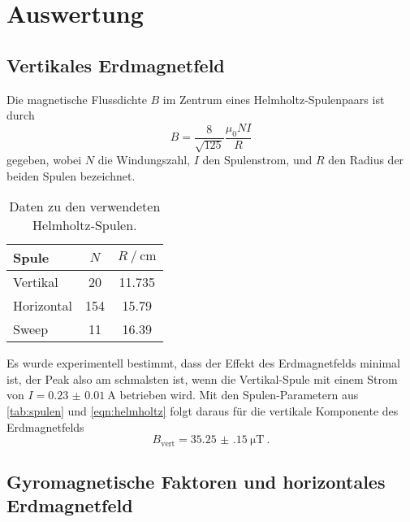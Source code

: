 \section{Auswertung}
\label{sec:auswertung}

\subsection{Vertikales Erdmagnetfeld}

Die magnetische Flussdichte $B$ im Zentrum eines Helmholtz-Spulenpaars ist durch
\begin{equation}
    B = \frac{8}{\sqrt{125}} \frac{\mu_0 NI}{R}
    \label{eqn:helmholtz}
\end{equation}
gegeben,
wobei $N$ die Windungszahl, $I$ den Spulenstrom, und $R$ den Radius der beiden Spulen bezeichnet. %

\begin{table}
    \centering
    \caption{Daten zu den verwendeten Helmholtz-Spulen. \cite{versuchsanleitung}}
    \label{tab:spulen}
    \begin{tabular}{l S S}
        \toprule
        Spule &
        {$N$} &
        {$R \mathbin{/} \si{\centi\meter}$} \\
        \midrule
        Vertikal   &  20 & 11.735 \\
        Horizontal & 154 & 15.79  \\
        Sweep      &  11 & 16.39  \\
        \bottomrule
    \end{tabular}
\end{table}

Es wurde experimentell bestimmt,
dass der Effekt des Erdmagnetfelds minimal ist,
der Peak also am schmalsten ist,
wenn die Vertikal-Spule mit einem Strom von ${ I = \SI{0.23(1)}{\ampere} }$ betrieben wird.
Mit den Spulen-Parametern aus \autoref{tab:spulen} und \autoref{eqn:helmholtz}
folgt daraus für die vertikale Komponente des Erdmagnetfelds
\[ B_\text{vert} = \SI{35.25(15)}{\micro\tesla} \ . \]


\subsection{Gyromagnetische Faktoren und horizontales Erdmagnetfeld}
\label{sec:auswertung:g_F}
\def\coloralpha{{\color{blue} \alpha}}
\def\colorbeta{{\color{blue} \beta}}

